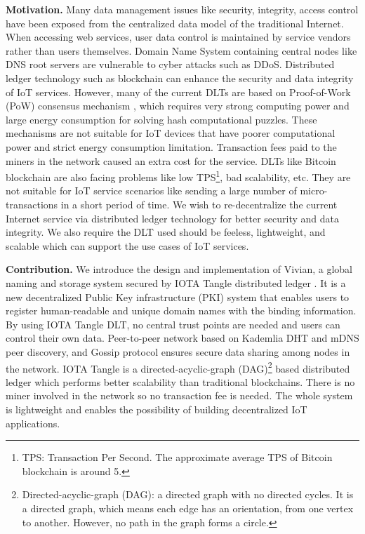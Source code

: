 \begin{onehalfspace}
\end{onehalfspace}
\noindent\textbf{Motivation.} Many data management issues like security, integrity, access control have been exposed from the centralized data model of the traditional Internet. 
When accessing web services, user data control is maintained by service vendors rather than users themselves.
Domain Name System containing central nodes like DNS root servers are vulnerable to cyber attacks such as DDoS. 
Distributed ledger technology such as blockchain can enhance the security and data integrity of IoT services. 
However, many of the current DLTs are based on Proof-of-Work (PoW) consensus mechanism \cite{10.1145/2976749.2978341}, which requires very strong computing power and large energy consumption for solving hash computational puzzles.
These mechanisms are not suitable for IoT devices that have poorer computational power and strict energy consumption limitation. Transaction fees paid to the miners in the network caused an extra cost for the service. 
DLTs like Bitcoin blockchain are also facing problems like low TPS\footnote{TPS: Transaction Per Second. The approximate average TPS of Bitcoin blockchain is around 5.}, bad scalability, etc.
They are not suitable for IoT service scenarios like sending a large number of micro-transactions in a short period of time. We wish to re-decentralize the current Internet service via distributed ledger technology for better security and data integrity.
We also require the DLT used should be feeless, lightweight, and scalable which can support the use cases of IoT services.


\begin{onehalfspace}
\end{onehalfspace}
\noindent\textbf{Contribution.} We introduce the design and implementation of Vivian, a global naming and storage system secured by IOTA Tangle distributed ledger \cite{popov2018tangle}. 
It is a new decentralized Public Key infrastructure (PKI) system that enables users to register human-readable and unique domain names with the binding information. 
By using IOTA Tangle DLT, no central trust points are needed and users can control their own data. 
Peer-to-peer network based on Kademlia DHT and mDNS peer discovery, and Gossip protocol ensures secure data sharing among nodes in the network.
IOTA Tangle is a directed-acyclic-graph (DAG)\footnote{Directed-acyclic-graph (DAG): a directed graph with no directed cycles. It is a directed graph, which means each edge has an orientation, from one vertex to another. However, no path in the graph forms a circle.} based distributed ledger which performs better scalability than traditional blockchains. There is no miner involved in the network so no transaction fee is needed.
The whole system is lightweight and enables the possibility of building decentralized IoT applications.